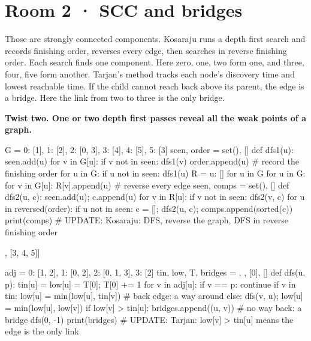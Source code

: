 \documentclass[11pt,a4paper]{report}
\begin{document}
\section*{Room 2 · SCC and bridges}
Those are strongly connected components. Kosaraju runs a depth first search and records finishing order, reverses every edge, then searches in reverse finishing order. Each search finds one component. Here zero, one, two form one, and three, four, five form another. Tarjan's method tracks each node's discovery time and lowest reachable time. If the child cannot reach back above its parent, the edge is a bridge. Here the link from two to three is the only bridge.
\begin{tcolorbox}[colback=yellow!12,colframe=orange!70!black,boxrule=0.4pt,left=4pt,right=4pt,top=2pt,bottom=2pt]\textbf{Twist two. One or two depth first passes reveal all the weak points of a graph.}\end{tcolorbox}
\begin{Code}
G = {0: [1], 1: [2], 2: [0, 3], 3: [4], 4: [5], 5: [3]}
seen, order = set(), []
def dfs1(u):
    seen.add(u)
    for v in G[u]:
        if v not in seen: dfs1(v)
    order.append(u)                         # record the finishing order
for u in G:
    if u not in seen: dfs1(u)
R = {u: [] for u in G}
for u in G:
    for v in G[u]: R[v].append(u)           # reverse every edge
seen, comps = set(), []
def dfs2(u, c):
    seen.add(u); c.append(u)
    for v in R[u]:
        if v not in seen: dfs2(v, c)
for u in reversed(order):
    if u not in seen:
        c = []; dfs2(u, c); comps.append(sorted(c))
print(comps)
# UPDATE: Kosaraju: DFS, reverse the graph, DFS in reverse finishing order
\end{Code}
\begin{Out}
[[0, 1, 2], [3, 4, 5]]
\end{Out}
\begin{Code}
adj = {0: [1, 2], 1: [0, 2], 2: [0, 1, 3], 3: [2]}
tin, low, T, bridges = {}, {}, [0], []
def dfs(u, p):
    tin[u] = low[u] = T[0]; T[0] += 1
    for v in adj[u]:
        if v == p: continue
        if v in tin: low[u] = min(low[u], tin[v])      # back edge: a way around
        else:
            dfs(v, u); low[u] = min(low[u], low[v])
            if low[v] > tin[u]: bridges.append((u, v))  # no way back: a bridge
dfs(0, -1)
print(bridges)
# UPDATE: Tarjan: low[v] > tin[u] means the edge is the only link
\end{Code}
\begin{Out}
[(2, 3)]
\end{Out}
\end{document}
